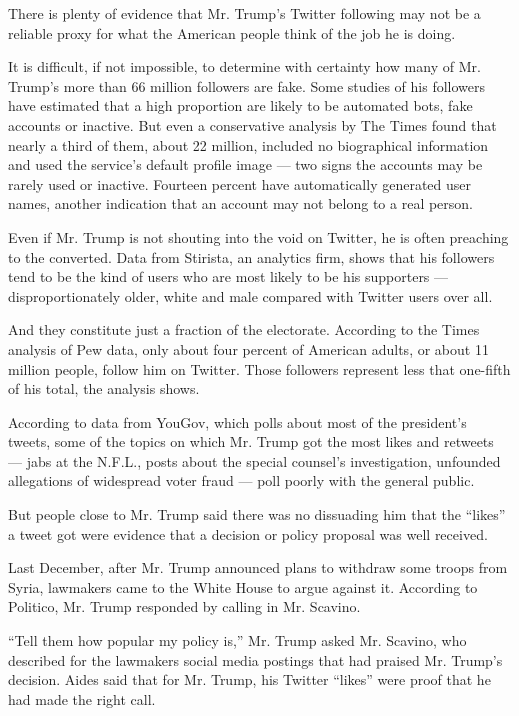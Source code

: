 There is plenty of evidence that Mr. Trump's Twitter following may not
be a reliable proxy for what the American people think of the job he is
doing.

It is difficult, if not impossible, to determine with certainty how many
of Mr. Trump's more than 66 million followers are fake. Some studies of
his followers have estimated that a high proportion are likely to be
automated bots, fake accounts or inactive. But even a conservative
analysis by The Times found that nearly a third of them, about 22
million, included no biographical information and used the service's
default profile image --- two signs the accounts may be rarely used or
inactive. Fourteen percent have automatically generated user names,
another indication that an account may not belong to a real person.

Even if Mr. Trump is not shouting into the void on Twitter, he is often
preaching to the converted. Data from Stirista, an analytics firm, shows
that his followers tend to be the kind of users who are most likely to
be his supporters --- disproportionately older, white and male compared
with Twitter users over all.

And they constitute just a fraction of the electorate. According to the
Times analysis of Pew data, only about four percent of American adults,
or about 11 million people, follow him on Twitter. Those followers
represent less that one-fifth of his total, the analysis shows.

According to data from YouGov, which polls about most of the president's
tweets, some of the topics on which Mr. Trump got the most likes and
retweets --- jabs at the N.F.L., posts about the special counsel's
investigation, unfounded allegations of widespread voter fraud --- poll
poorly with the general public.

But people close to Mr. Trump said there was no dissuading him that the
``likes'' a tweet got were evidence that a decision or policy proposal
was well received.

Last December, after Mr. Trump announced plans to withdraw some troops
from Syria, lawmakers came to the White House to argue against it.
According to Politico, Mr. Trump responded by calling in Mr. Scavino.

``Tell them how popular my policy is,'' Mr. Trump asked Mr. Scavino, who
described for the lawmakers social media postings that had praised Mr.
Trump's decision. Aides said that for Mr. Trump, his Twitter ``likes''
were proof that he had made the right call.

